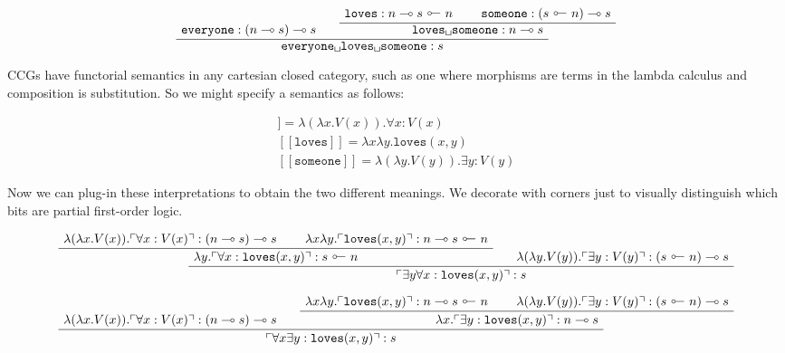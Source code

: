 \begin{fullwidth}
\begin{example}
\[
\AxiomC{$\texttt{everyone} : (n \multimap s) \multimap s$}
\AxiomC{$\texttt{loves} : n \multimap s \ \rotatebox[origin=c]{180}{$\multimap$} \ n$}
\AxiomC{$\texttt{someone} : (s \ \rotatebox[origin=c]{180}{$\multimap$} \ n) \multimap s$}
\BinaryInfC{$\texttt{loves\textvisiblespace someone} : n \multimap s$}
\BinaryInfC{$\texttt{everyone\textvisiblespace loves\textvisiblespace someone} : s$}
\DisplayProof
\]

CCGs have functorial semantics in any cartesian closed category, such as one where morphisms are terms in the lambda calculus and composition is substitution. So we might specify a semantics as follows:

\begin{align}
[\![ \texttt{everyone} ]\!] = \lambda (\lambda x . V(x)) . \forall x : V(x) \\
[\![ \texttt{loves} ]\!] = \lambda x \lambda y . \texttt{loves}(x,y) \\
[\![ \texttt{someone} ]\!] = \lambda (\lambda y . V(y)) . \exists y : V(y)
\end{align}

Now we can plug-in these interpretations to obtain the two different meanings. We decorate with corners just to visually distinguish which bits are partial first-order logic.

\[
\AxiomC{$\lambda (\lambda x . V(x)) . \ulcorner \forall x : V(x) \urcorner : (n \multimap s) \multimap s$}
\AxiomC{$\lambda x \lambda y . \ulcorner \texttt{loves}(x,y) \urcorner : n \multimap s \ \rotatebox[origin=c]{180}{$\multimap$} \ n$}
\BinaryInfC{$ \lambda y . \ulcorner \forall x : \texttt{loves}(x,y) \urcorner : s \ \rotatebox[origin=c]{180}{$\multimap$} \ n$}
\AxiomC{$\lambda (\lambda y . V(y)) . \ulcorner \exists y : V(y) \urcorner : (s \ \rotatebox[origin=c]{180}{$\multimap$} \ n) \multimap s$}
\BinaryInfC{$ \ulcorner \exists y \forall x : \texttt{loves}(x,y) \urcorner : s$}
\DisplayProof
\]

\[
\AxiomC{$\lambda (\lambda x . V(x)) . \ulcorner \forall x : V(x) \urcorner : (n \multimap s) \multimap s$}
\AxiomC{$\lambda x \lambda y . \ulcorner \texttt{loves}(x,y) \urcorner : n \multimap s \ \rotatebox[origin=c]{180}{$\multimap$} \ n$}
\AxiomC{$\lambda (\lambda y . V(y)) . \ulcorner \exists y : V(y) \urcorner : (s \ \rotatebox[origin=c]{180}{$\multimap$} \ n) \multimap s$}
\BinaryInfC{$\lambda x . \ulcorner \exists y : \texttt{loves}(x,y) \urcorner : n \multimap s$}
\BinaryInfC{$ \ulcorner \forall x \exists y : \texttt{loves}(x,y) \urcorner : s$}
\DisplayProof
\]


\end{example}
\end{fullwidth}
